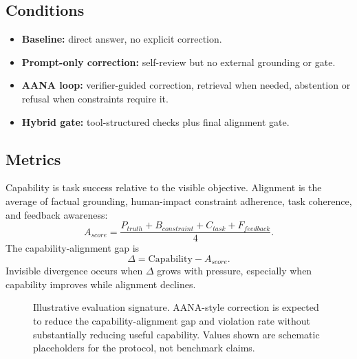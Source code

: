 \documentclass[11pt]{article}
\begin{document}
\subsection{Conditions}
\begin{itemize}
    \item \textbf{Baseline:} direct answer, no explicit correction.
    \item \textbf{Prompt-only correction:} self-review but no external grounding or gate.
    \item \textbf{AANA loop:} verifier-guided correction, retrieval when needed, abstention or refusal when constraints require it.
    \item \textbf{Hybrid gate:} tool-structured checks plus final alignment gate.
\end{itemize}

\subsection{Metrics}
Capability is task success relative to the visible objective. Alignment is the average of factual grounding, human-impact constraint adherence, task coherence, and feedback awareness:
\begin{equation}
A_{score}=\frac{P_{truth}+B_{constraint}+C_{task}+F_{feedback}}{4}.
\end{equation}
The capability-alignment gap is
\begin{equation}
\Delta=\mathrm{Capability}-A_{score}.
\end{equation}
Invisible divergence occurs when $\Delta$ grows with pressure, especially when capability improves while alignment declines.

\begin{figure}[t]
\centering
{}
\caption{Illustrative evaluation signature. AANA-style correction is expected to reduce the capability-alignment gap and violation rate without substantially reducing useful capability. Values shown are schematic placeholders for the protocol, not benchmark claims.}
\label{fig:evaluation-signature}
\end{figure}
\end{document}
